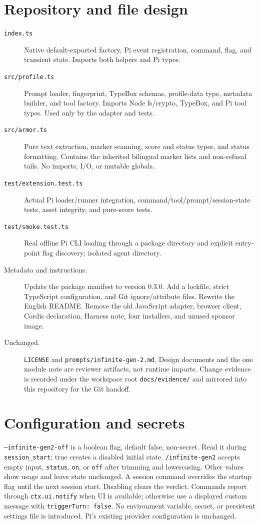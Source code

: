 \documentclass[10pt]{ltjsarticle}
\begin{document}
\section{Repository and file design}
\begin{description}
\item[\texttt{index.ts}] Native default-exported factory, Pi event registration,
command, flag, and transient state. Imports both helpers and Pi types.
\item[\texttt{src/profile.ts}] Prompt loader, fingerprint, TypeBox schemas,
profile-data type, metadata builder, and tool factory. Imports Node fs/crypto,
TypeBox, and Pi tool types. Used only by the adapter and tests.
\item[\texttt{src/armor.ts}] Pure text extraction, marker scanning, score and
status types, and status formatting. Contains the inherited bilingual marker
lists and non-refusal tails. No imports, I/O, or mutable globals.
\item[\texttt{test/extension.test.ts}] Actual Pi loader/runner integration,
command/tool/prompt/session-state tests, asset integrity, and pure-score tests.
\item[\texttt{test/smoke.test.ts}] Real offline Pi CLI loading through a package
directory and explicit entry-point flag discovery; isolated agent directory.
\item[Metadata and instructions.] Update the package manifest to version 0.3.0.
Add a lockfile, strict TypeScript configuration, and Git ignore/attribute files.
Rewrite the English README. Remove the old JavaScript adapter, browser client,
Cordis declaration, Harness note, four installers, and unused sponsor image.
\item[Unchanged.] \texttt{LICENSE} and \texttt{prompts/infinite-gen-2.md}.
Design documents and the one module note are reviewer artifacts, not runtime
imports. Change evidence is recorded under the workspace root
\texttt{docs/evidence/} and mirrored into this repository for the Git handoff.
\end{description}

\section{Configuration and secrets}
\texttt{--infinite-gen2-off} is a boolean flag, default false, non-secret. Read
it during \texttt{session\_start}; true creates a disabled initial state.
\texttt{/infinite-gen2} accepts empty input, \texttt{status}, \texttt{on}, or
\texttt{off} after trimming and lowercasing. Other values show usage and leave
state unchanged. A session command overrides the startup flag until the next
session start. Disabling clears the verdict. Commands report through
\texttt{ctx.ui.notify} when UI is available; otherwise use a displayed custom
message with \texttt{triggerTurn: false}. No environment variable, secret, or
persistent settings file is introduced. Pi's existing provider configuration
is unchanged.
\end{document}

